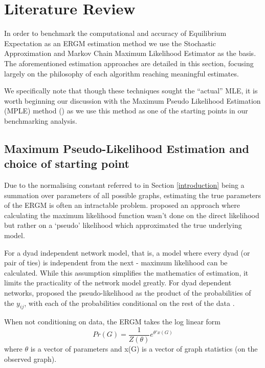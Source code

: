 \section{Literature Review}
\label{literature_review}

In order to benchmark the computational and accuracy of Equilibrium Expectation as an ERGM estimation method we use the Stochastic Approximation and Markov Chain Maximum Likelihood Estimator as the basis. The aforementioned estimation approaches are detailed in this section, focusing largely on the philosophy of each algorithm reaching meaningful estimates.

We specifically note that though these techniques sought the ``actual'' MLE, it is worth beginning our discussion with the Maximum Pseudo Likelihood Estimation (MPLE) method (\cite{straussikeda1990}) as we use this method as one of the starting points in our benchmarking analysis.

\subsection{Maximum Pseudo-Likelihood Estimation and choice of starting point}


Due to the normalising constant referred to in Section \ref{introduction} being a summation over parameters of all possible graphs, estimating the true parameters of the ERGM is often an intractable problem. \citeauthor{straussikeda1990} proposed an approach where calculating the maximum likelihood function wasn't done on the direct likelihood but rather on a `pseudo' likelihood which approximated the true underlying model.

For a dyad independent network model, that is, a model where every dyad (or pair of ties) is independent from the next - maximum likelihood can be calculated. While this assumption simplifies the mathematics of estimation, it limits the practicality of the network model greatly. For dyad dependent networks, \citeauthor{straussikeda1990} proposed the pseudo-likelihood as the product of the probabilities of the $y_{ij}$, with each of the probabilities conditional on the rest of the data \citet{straussikeda1990}.

When not conditioning on data, the ERGM takes the log linear form
\begin{equation}
\label{eqn:ergm_general_form}
    Pr(G) = {\frac{1}{Z(\theta)}}e^{\theta'x(G)}
\end{equation}
where $\theta$ is a vector of parameters and x(G) is a vector of graph statistics (on the observed graph).

